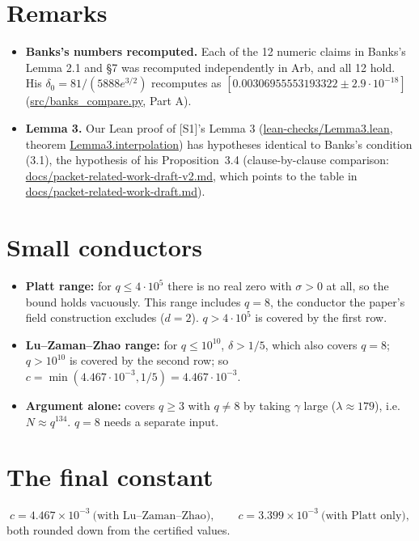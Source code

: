 \documentclass[11pt]{article}
\begin{document}
\section{Remarks}

\begin{itemize}
\item \textbf{Banks's numbers recomputed.} Each of the 12 numeric claims in Banks's Lemma 2.1 and \S7 was recomputed independently in Arb, and all 12 hold. His $\delta_0 = 81/(5888e^{3/2})$ recomputes as $[0.00306955553193322 \pm 2.9\cdot10^{-18}]$ (\url{src/banks_compare.py}, Part A).
\item \textbf{Lemma 3.} Our Lean proof of [S1]'s Lemma 3 (\url{lean-checks/Lemma3.lean}, theorem \url{Lemma3.interpolation}) has hypotheses identical to Banks's condition (3.1), the hypothesis of his Proposition~3.4 (clause-by-clause comparison: \url{docs/packet-related-work-draft-v2.md}, which points to the table in \url{docs/packet-related-work-draft.md}).
\end{itemize}

\section{Small conductors}

\begin{itemize}
\item \textbf{Platt range:} for $q\le 4\cdot10^5$ there is no real zero with $\sigma>0$ at all, so the bound holds vacuously. This range includes $q=8$, the conductor the paper's field construction excludes ($d=2$). $q>4\cdot10^5$ is covered by the first row.
\item \textbf{Lu--Zaman--Zhao range:} for $q\le10^{10}$, $\delta>1/5$, which also covers $q=8$; $q>10^{10}$ is covered by the second row; so $c=\min(4.467\cdot10^{-3},1/5)=4.467\cdot10^{-3}$.
\item \textbf{Argument alone:} covers $q\ge3$ with $q\ne8$ by taking $\gamma$ large ($\lambda\approx179$), i.e.\ $N\approx q^{134}$. $q=8$ needs a separate input.
\end{itemize}

\section{The final constant}

\[
c = 4.467\times10^{-3}\ \text{(with Lu--Zaman--Zhao)},\qquad c = 3.399\times10^{-3}\ \text{(with Platt only)},
\]
both rounded down from the certified values.
\end{document}
